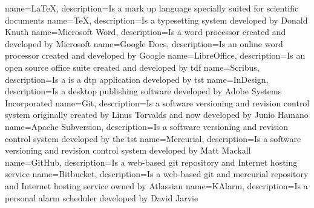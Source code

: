 {
    name=\LaTeX,
    description={Is a mark up language specially suited for scientific documents}
}
{
    name=\TeX,
    description={Is a typesetting system developed by Donald Knuth}
}
{
    name={Microsoft Word},
    description={Is a word processor created and developed by Microsoft}
}
{
    name={Google Docs},
    description={Is an online word processor created and developed by Google}
}
{
    name=LibreOffice,
    description={Is an open source office suite created and developed by \acrlong{tdf}}
}
{
    name=Scribus,
    description={Is a is a \acrlong{dtp} application developed by \acrlong{tst}}
}
{
    name=InDesign,
    description={Is a desktop publishing software developed by Adobe Systems Incorporated}
}
{
    name=Git,
    description={Is a software versioning and revision control system originally created by Linus Torvalds and now developed by Junio Hamano}
}
{
    name={Apache Subversion},
    description={Is a software versioning and revision control system developed by the \acrlong{tst}}
}
{
    name=Mercurial,
    description={Is a software versioning and revision control system developed by Matt Mackall}
}
{
    name=GitHub,
    description={Is a web-based \gls{git} repository and Internet hosting service}
}
{
    name=Bitbucket,
    description={Is a web-based \gls{git} and \gls{mercurial} repository and Internet hosting service owned by Atlassian}
}
{
    name=KAlarm,
    description={Is a personal alarm scheduler developed by David Jarvie}
}

